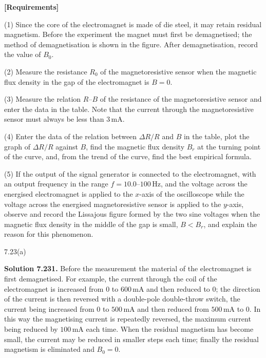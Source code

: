 \textbf{[Requirements]}

(1) Since the core of the electromagnet is made of die steel, it may retain residual magnetism. Before the experiment the magnet must first be demagnetised; the method of demagnetisation is shown in the figure. After demagnetisation, record the value of $B_0$.

(2) Measure the resistance $R_0$ of the magnetoresistive sensor when the magnetic flux density in the gap of the electromagnet is $B=0$.

(3) Measure the relation $R$--$B$ of the resistance of the magnetoresistive sensor and enter the data in the table. Note that the current through the magnetoresistive sensor must always be less than $3\,\mathrm{mA}$.

(4) Enter the data of the relation between $\Delta R/R$ and $B$ in the table, plot the graph of $\Delta R/R$ against $B$, find the magnetic flux density $B_r$ at the turning point of the curve, and, from the trend of the curve, find the best empirical formula.

(5) If the output of the signal generator is connected to the electromagnet, with an output frequency in the range $f=10.0$--$100\,\mathrm{Hz}$, and the voltage across the energised electromagnet is applied to the $x$-axis of the oscilloscope while the voltage across the energised magnetoresistive sensor is applied to the $y$-axis, observe and record the Lissajous figure formed by the two sine voltages when the magnetic flux density in the middle of the gap is small, $B<B_r$, and explain the reason for this phenomenon.

\begin{figbox}{7.23(a)}
\end{figbox}


\textbf{Solution 7.23}\quad \textbf{1.} Before the measurement the material of the electromagnet is first demagnetised. For example, the current through the coil of the electromagnet is increased from 0 to $600\,\mathrm{mA}$ and then reduced to 0; the direction of the current is then reversed with a double-pole double-throw switch, the current being increased from 0 to $500\,\mathrm{mA}$ and then reduced from $500\,\mathrm{mA}$ to 0. In this way the magnetising current is repeatedly reversed, the maximum current being reduced by $100\,\mathrm{mA}$ each time. When the residual magnetism has become small, the current may be reduced in smaller steps each time; finally the residual magnetism is eliminated and $B_0=0$.

